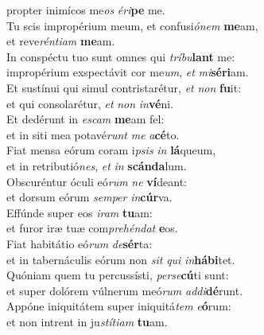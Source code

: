 \evenverse propter inimícos me\textit{os} \textit{é}\textit{ri}\textbf{pe} me.\\
\oddverse Tu scis impropérium meum, et confusi\textit{ó}\textit{nem} \textbf{me}am,~\*\\
\oddverse et reve\textit{rén}\textit{ti}\textit{am} \textbf{me}am.\\
\evenverse In conspéctu tuo sunt omnes qui \textit{trí}\textit{bu}\textbf{lant} me:~\*\\
\evenverse impropérium exspectávit cor me\textit{um}, \textit{et} \textit{mi}\textbf{sé}\textbf{ri}am.\\
\oddverse Et sustínui qui simul contristarétur, \textit{et} \textit{non} \textbf{fu}it:~\*\\
\oddverse et qui consolarétur, \textit{et} \textit{non} \textit{in}\textbf{vé}ni.\\
\evenverse Et dedérunt in \textit{e}\textit{scam} \textbf{me}am fel:~\*\\
\evenverse et in siti mea potavé\textit{runt} \textit{me} \textit{a}\textbf{cé}to.\\
\oddverse Fiat mensa eórum coram i\textit{psis} \textit{in} \textbf{lá}queum,~\*\\
\oddverse et in retributió\textit{nes}, \textit{et} \textit{in} \textbf{scán}\textbf{da}lum.\\
\evenverse Obscuréntur óculi eó\textit{rum} \textit{ne} \textbf{ví}deant:~\*\\
\evenverse et dorsum eórum \textit{sem}\textit{per} \textit{in}\textbf{cúr}va.\\
\oddverse Effúnde super eos \textit{i}\textit{ram} \textbf{tu}am:~\*\\
\oddverse et furor iræ tuæ com\textit{pre}\textit{hén}\textit{dat} \textbf{e}os.\\
\evenverse Fiat habitátio eó\textit{rum} \textit{de}\textbf{sér}ta:~\*\\
\evenverse et in tabernáculis eórum non \textit{sit} \textit{qui} \textit{in}\textbf{há}\textbf{bi}tet.\\
\oddverse Quóniam quem tu percussísti, \textit{per}\textit{se}\textbf{cú}ti sunt:~\*\\
\oddverse et super dolórem vúlnerum meó\textit{rum} \textit{ad}\textit{di}\textbf{dé}runt.\\
\evenverse Appóne iniquitátem super iniquitá\textit{tem} \textit{e}\textbf{ó}rum:~\*\\
\evenverse et non intrent in ju\textit{stí}\textit{ti}\textit{am} \textbf{tu}am.\\

